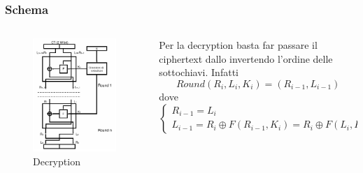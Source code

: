 	\begin{frame}
		\frametitle{Schema}
		\begin{columns}
			\begin{column}{0.4\textwidth}
				\begin{center}
					\begin{figure}
						\includegraphics[width=\columnwidth]{img/feistel2}
						\caption{Decryption}			
					\end{figure}
				\end{center}
			\end{column}
			\begin{column}{0.7\textwidth}
				Per la decryption basta far passare il ciphertext dallo  invertendo l'ordine delle sottochiavi. Infatti
				$$Round(R_{i},L_{i},K_i) = (R_{i-1},L_{i-1})$$ dove
				$$\begin{cases}
				R_{i-1} = L_i \\
				L_{i-1} = R_{i} \oplus F(R_{i-1},K_i) = R_{i} \oplus F(L_i,K_i)
				\end{cases}$$
			\end{column}
		\end{columns}
	\end{frame}

